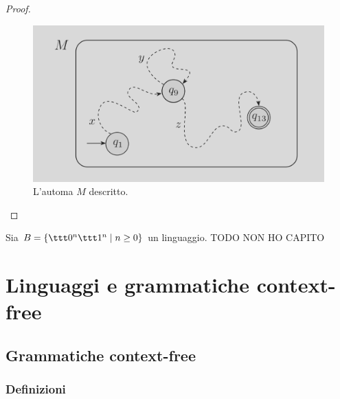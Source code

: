 \documentclass[a4paper, 12pt]{report}
\begin{document}
\begin{proof}
        \begin{figure}[H]
            \centering
            \includegraphics[scale=0.35]{../assets/pump-neg.png}
            \caption{L'automa $M$ descritto.}
        \end{figure}

    \end{proof}

    \begin{example}
        Sia $B = \{\ttt 0 ^n \ttt 1 ^n \mid n \ge 0\}$ un linguaggio. TODO NON HO CAPITO
    \end{example}

    \chapter{Linguaggi e grammatiche context-free}

    \section{Grammatiche context-free}

    \subsection{Definizioni}
\end{document}

